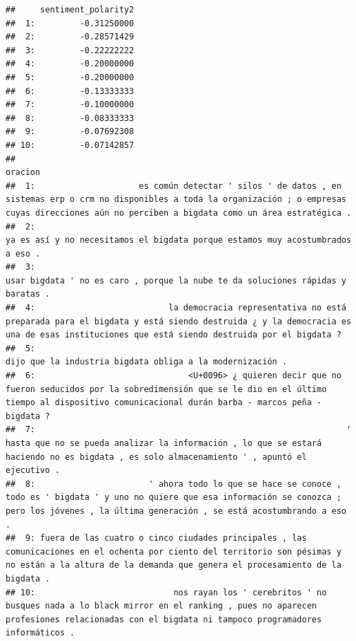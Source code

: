 \documentclass[
]{book}
\begin{document}
\begin{verbatim}
##     sentiment_polarity2
##  1:         -0.31250000
##  2:         -0.28571429
##  3:         -0.22222222
##  4:         -0.20000000
##  5:         -0.20000000
##  6:         -0.13333333
##  7:         -0.10000000
##  8:         -0.08333333
##  9:         -0.07692308
## 10:         -0.07142857
##                                                                                                                                                                                                        oracion
##  1:                     es común detectar ' silos ' de datos , en sistemas erp o crm no disponibles a toda la organización ; o empresas cuyas direcciones aún no perciben a bigdata como un área estratégica .
##  2:                                                                                                                             ya es así y no necesitamos el bigdata porque estamos muy acostumbrados a eso .
##  3:                                                                                                                            usar bigdata ' no es caro , porque la nube te da soluciones rápidas y baratas .
##  4:                           la democracia representativa no está preparada para el bigdata y está siendo destruida ¿ y la democracia es una de esas instituciones que está siendo destruida por el bigdata ?
##  5:                                                                                                                                                  dijo que la industria bigdata obliga a la modernización .
##  6:                               <U+0096> ¿ quieren decir que no fueron seducidos por la sobredimensión que se le dio en el último tiempo al dispositivo comunicacional durán barba - marcos peña - bigdata ?
##  7:                                                               ' hasta que no se pueda analizar la información , lo que se estará haciendo no es bigdata , es solo almacenamiento ' , apuntó el ejecutivo .
##  8:                       ' ahora todo lo que se hace se conoce , todo es ' bigdata ' y uno no quiere que esa información se conozca ; pero los jóvenes , la última generación , se está acostumbrando a eso .
##  9: fuera de las cuatro o cinco ciudades principales , las comunicaciones en el ochenta por ciento del territorio son pésimas y no están a la altura de la demanda que genera el procesamiento de la bigdata .
## 10:                            nos rayan los ' cerebritos ' no busques nada a lo black mirror en el ranking , pues no aparecen profesiones relacionadas con el bigdata ni tampoco programadores informáticos .
\end{verbatim}
\end{document}
